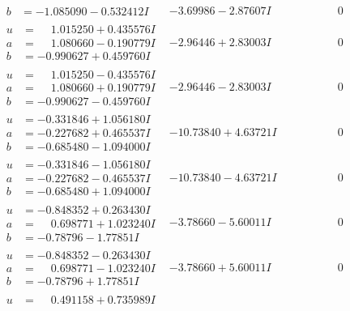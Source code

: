 \documentclass[1p]{elsarticle_modified}
\theoremstyle{definition}
\begin{document}
$$\begin{array}{c|c|c}
\begin{aligned}
b &= -1.085090 - 0.532412 I\end{aligned}
 & -3.69986 - 2.87607 I & \phantom{-0.000000 } 0 \\ \hline\begin{aligned}
u &= \phantom{-}1.015250 + 0.435576 I \\
a &= \phantom{-}1.080660 - 0.190779 I \\
b &= -0.990627 + 0.459760 I\end{aligned}
 & -2.96446 + 2.83003 I & \phantom{-0.000000 } 0 \\ \hline\begin{aligned}
u &= \phantom{-}1.015250 - 0.435576 I \\
a &= \phantom{-}1.080660 + 0.190779 I \\
b &= -0.990627 - 0.459760 I\end{aligned}
 & -2.96446 - 2.83003 I & \phantom{-0.000000 } 0 \\ \hline\begin{aligned}
u &= -0.331846 + 1.056180 I \\
a &= -0.227682 + 0.465537 I \\
b &= -0.685480 - 1.094000 I\end{aligned}
 & -10.73840 + 4.63721 I & \phantom{-0.000000 } 0 \\ \hline\begin{aligned}
u &= -0.331846 - 1.056180 I \\
a &= -0.227682 - 0.465537 I \\
b &= -0.685480 + 1.094000 I\end{aligned}
 & -10.73840 - 4.63721 I & \phantom{-0.000000 } 0 \\ \hline\begin{aligned}
u &= -0.848352 + 0.263430 I \\
a &= \phantom{-}0.698771 + 1.023240 I \\
b &= -0.78796 - 1.77851 I\end{aligned}
 & -3.78660 - 5.60011 I & \phantom{-0.000000 } 0 \\ \hline\begin{aligned}
u &= -0.848352 - 0.263430 I \\
a &= \phantom{-}0.698771 - 1.023240 I \\
b &= -0.78796 + 1.77851 I\end{aligned}
 & -3.78660 + 5.60011 I & \phantom{-0.000000 } 0 \\ \hline\begin{aligned}
u &= \phantom{-}0.491158 + 0.735989 I \\

\end{aligned}
\end{array}$$
\end{document}
